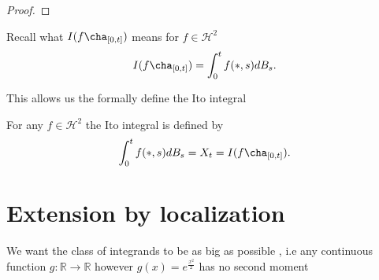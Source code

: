 \begin{proof}
  
\end{proof}
\begin{remark}
  Recall what $I(f\cha_{[0,t]})$  means for $f \in  \mathcal{H}^2$ 
  \begin{align*}
    I(f\cha_{[0,t]}) = \int_0^{t} f(*,s) dB_s  
  .\end{align*}
\end{remark}
This allows us the formally define the Ito integral 
\begin{definition}
 For any $f \in  \mathcal{H}^2$  the Ito integral is defined by 
 \begin{align*}
   \int_0^{t} f(*,s) dB_s = X_t = I(f \cha_{[0,t]})
 .\end{align*}
\end{definition}
\section{Extension by localization}
We want the class of integrands to be as big as possible , i.e any continuous function $g : \mathbb{R} \to  \mathbb{R}$ however $g(x) = e^{\frac{x^2}{2}} $  has no second moment
